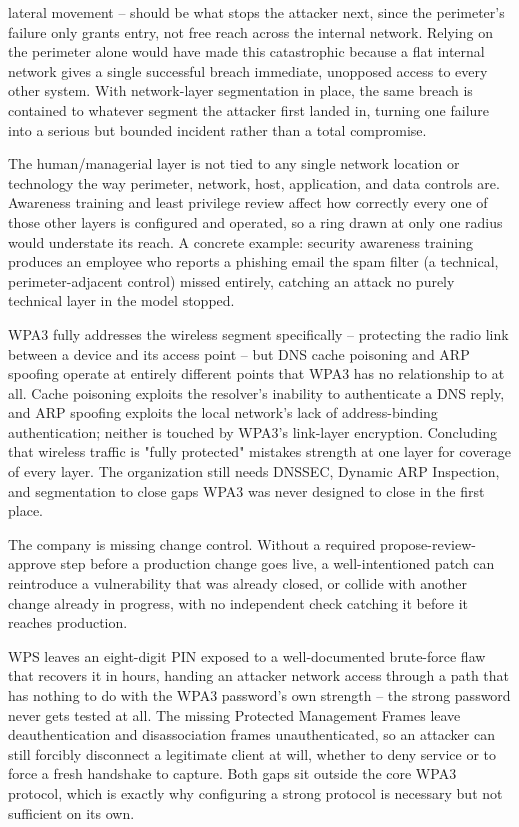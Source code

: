 \begin{answerkey}
lateral movement -- should be what stops the attacker next, since the perimeter's failure only grants
entry, not free reach across the internal network. Relying on the perimeter alone would have made
this catastrophic because a flat internal network gives a single successful breach immediate,
unopposed access to every other system. With network-layer segmentation in place, the same breach
is contained to whatever segment the attacker first landed in, turning one failure into a serious
but bounded incident rather than a total compromise.
\item The human/managerial layer is not tied to any single network location or technology the way
perimeter, network, host, application, and data controls are. Awareness training and least
privilege review affect how correctly every one of those other layers is configured and operated,
so a ring drawn at only one radius would understate its reach. A concrete example: security
awareness training produces an employee who reports a phishing email the spam filter (a technical,
perimeter-adjacent control) missed entirely, catching an attack no purely technical layer in the
model stopped.
\item WPA3 fully addresses the wireless segment specifically -- protecting the radio link between a
device and its access point -- but DNS cache poisoning and ARP spoofing operate at entirely
different points that WPA3 has no relationship to at all. Cache poisoning exploits the resolver's
inability to authenticate a DNS reply, and ARP spoofing exploits the local network's lack of
address-binding authentication; neither is touched by WPA3's link-layer encryption. Concluding that
wireless traffic is "fully protected" mistakes strength at one layer for coverage of every layer.
The organization still needs DNSSEC, Dynamic ARP Inspection, and segmentation to close gaps WPA3
was never designed to close in the first place.
\item The company is missing change control. Without a required propose-review-approve step before
a production change goes live, a well-intentioned patch can reintroduce a vulnerability that was
already closed, or collide with another change already in progress, with no independent check
catching it before it reaches production.
\item WPS leaves an eight-digit PIN exposed to a well-documented brute-force flaw that recovers it
in hours, handing an attacker network access through a path that has nothing to do with the WPA3
password's own strength -- the strong password never gets tested at all. The missing Protected
Management Frames leave deauthentication and disassociation frames unauthenticated, so an attacker
can still forcibly disconnect a legitimate client at will, whether to deny service or to force a
fresh handshake to capture. Both gaps sit outside the core WPA3 protocol, which is exactly why
configuring a strong protocol is necessary but not sufficient on its own.
\end{answerkey}

